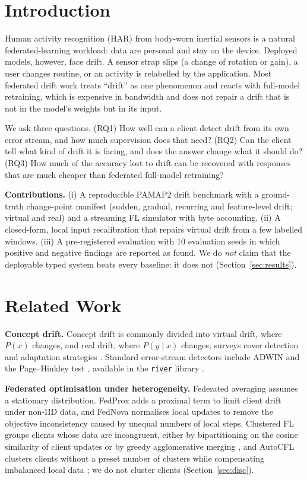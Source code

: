 \documentclass[journal]{IEEEtran}
\begin{document}
\section{Introduction}
Human activity recognition (HAR) from body-worn inertial sensors is a natural federated-learning workload: data are personal and stay on the device. Deployed models, however, face drift. A sensor strap slips (a change of rotation or gain), a user changes routine, or an activity is relabelled by the application. Most federated drift work treats ``drift'' as one phenomenon and reacts with full-model retraining, which is expensive in bandwidth and does not repair a drift that is not in the model's weights but in its input.

We ask three questions. (RQ1) How well can a client detect drift from its own error stream, and how much supervision does that need? (RQ2) Can the client tell what kind of drift it is facing, and does the answer change what it should do? (RQ3) How much of the accuracy lost to drift can be recovered with responses that are much cheaper than federated full-model retraining?

\textbf{Contributions.} (i) A reproducible PAMAP2 drift benchmark with a ground-truth change-point manifest (sudden, gradual, recurring and feature-level drift; virtual and real) and a streaming FL simulator with byte accounting. (ii) A closed-form, local input recalibration that repairs virtual drift from a few labelled windows. (iii) A pre-registered evaluation with 10 evaluation seeds in which positive and negative findings are reported as found. We do \emph{not} claim that the deployable typed system beats every baseline: it does not (Section~\ref{sec:results}).

\section{Related Work}
\textbf{Concept drift.} Concept drift is commonly divided into virtual drift, where $P(x)$ changes, and real drift, where $P(y\mid x)$ changes; surveys cover detection and adaptation strategies \cite{gama2014survey,lu2019learning}. Standard error-stream detectors include ADWIN \cite{bifet2007adwin} and the Page--Hinkley test \cite{page1954}, available in the \texttt{river} library \cite{montiel2021river}.

\textbf{Federated optimisation under heterogeneity.} Federated averaging \cite{mcmahan2017fedavg} assumes a stationary distribution. FedProx \cite{li2020fedprox} adds a proximal term to limit client drift under non-IID data, and FedNova \cite{wang2020fednova} normalises local updates to remove the objective inconsistency caused by unequal numbers of local steps. Clustered FL groups clients whose data are incongruent, either by bipartitioning on the cosine similarity of client updates \cite{sattler2021cfl} or by greedy agglomerative merging \cite{mehta2023flacc}, and AutoCFL clusters clients without a preset number of clusters while compensating imbalanced local data \cite{autocfl2024}; we do not cluster clients (Section~\ref{sec:disc}).
\end{document}
